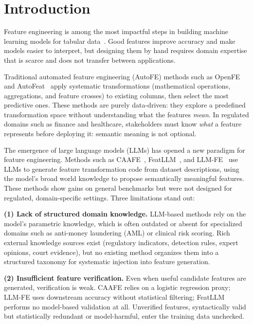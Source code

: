 \section{Introduction}
\label{sec:intro}

Feature engineering is among the most impactful steps in building machine learning models for tabular data~\cite{domingos2012few}. Good features improve accuracy and make models easier to interpret, but designing them by hand requires domain expertise that is scarce and does not transfer between applications.

Traditional automated feature engineering (AutoFE) methods such as OpenFE~\cite{zhang2023openfe} and AutoFeat~\cite{horn2019autofeat} apply systematic transformations (mathematical operations, aggregations, and feature crosses) to existing columns, then select the most predictive ones. These methods are purely data-driven: they explore a predefined transformation space without understanding what the features \emph{mean}. In regulated domains such as finance and healthcare, stakeholders must know \emph{what} a feature represents before deploying it: semantic meaning is not optional.

The emergence of large language models (LLMs) has opened a new paradigm for feature engineering. Methods such as CAAFE~\cite{hollmann2023caafe}, FeatLLM~\cite{han2024featllm}, and LLM-FE~\cite{abhyankar2025llmfe} use LLMs to generate feature transformation code from dataset descriptions, using the model's broad world knowledge to propose semantically meaningful features. These methods show gains on general benchmarks but were not designed for regulated, domain-specific settings. Three limitations stand out:

\textbf{(1) Lack of structured domain knowledge.}
LLM-based methods rely on the model's parametric knowledge, which is often outdated or absent for specialized domains such as anti-money laundering (AML) or clinical risk scoring. Rich external knowledge sources exist (regulatory indicators, detection rules, expert opinions, court evidence), but no existing method organizes them into a structured taxonomy for systematic injection into feature generation.

\textbf{(2) Insufficient feature verification.}
Even when useful candidate features are generated, verification is weak. CAAFE relies on a logistic regression proxy; LLM-FE uses downstream accuracy without statistical filtering; FeatLLM performs no model-based validation at all. Unverified features, syntactically valid but statistically redundant or model-harmful, enter the training data unchecked.


